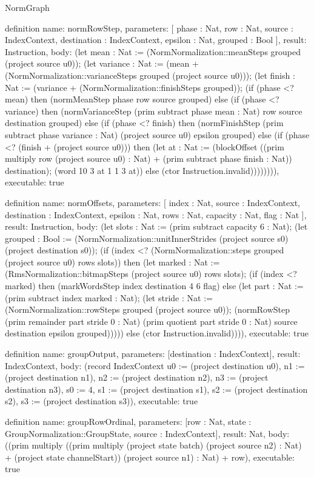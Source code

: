 \begin{lexlean}{NormGraph}
\begin{semanticmodule}
definition{
  name: normRowStep,
  parameters: [
    phase : Nat,
    row : Nat,
    source : IndexContext,
    destination : IndexContext,
    epsilon : Nat,
    grouped : Bool
  ],
  result: Instruction,
  body: (let mean : Nat := (NormNormalization::meanSteps grouped (project source u0)); (let variance : Nat := (mean + (NormNormalization::varianceSteps grouped (project source u0))); (let finish : Nat := (variance + (NormNormalization::finishSteps grouped)); (if (phase <? mean) then (normMeanStep phase row source grouped) else (if (phase <? variance) then (normVarianceStep (prim subtract phase mean : Nat) row source destination grouped) else (if (phase <? finish) then (normFinishStep (prim subtract phase variance : Nat) (project source u0) epsilon grouped) else (if (phase <? (finish + (project source u0))) then (let at : Nat := (blockOffset ((prim multiply row (project source u0) : Nat) + (prim subtract phase finish : Nat)) destination); (word 10 3 at 1 1 3 at)) else (ctor Instruction.invalid)))))))),
  executable: true
}

definition{
  name: normOffsets,
  parameters: [
    index : Nat,
    source : IndexContext,
    destination : IndexContext,
    epsilon : Nat,
    rows : Nat,
    capacity : Nat,
    flag : Nat
  ],
  result: Instruction,
  body: (let slots : Nat := (prim subtract capacity 6 : Nat); (let grouped : Bool := (NormNormalization::unitInnerStrides (project source s0) (project destination s0)); (if (index <? (NormNormalization::steps grouped (project source u0) rows slots)) then (let marked : Nat := (RmsNormalization::bitmapSteps (project source u0) rows slots); (if (index <? marked) then (markWordsStep index destination 4 6 flag) else (let part : Nat := (prim subtract index marked : Nat); (let stride : Nat := (NormNormalization::rowSteps grouped (project source u0)); (normRowStep (prim remainder part stride 0 : Nat) (prim quotient part stride 0 : Nat) source destination epsilon grouped))))) else (ctor Instruction.invalid)))),
  executable: true
}

definition{
  name: groupOutput,
  parameters: [destination : IndexContext],
  result: IndexContext,
  body: (record IndexContext {u0 := (project destination u0), n1 := (project destination n1), n2 := (project destination n2), n3 := (project destination n3), s0 := 4, s1 := (project destination s1), s2 := (project destination s2), s3 := (project destination s3)}),
  executable: true
}

definition{
  name: groupRowOrdinal,
  parameters: [row : Nat, state : GroupNormalization::GroupState, source : IndexContext],
  result: Nat,
  body: ((prim multiply ((prim multiply (project state batch) (project source n2) : Nat) + (project state channelStart)) (project source n1) : Nat) + row),
  executable: true
}


\end{semanticmodule}
\end{lexlean}
